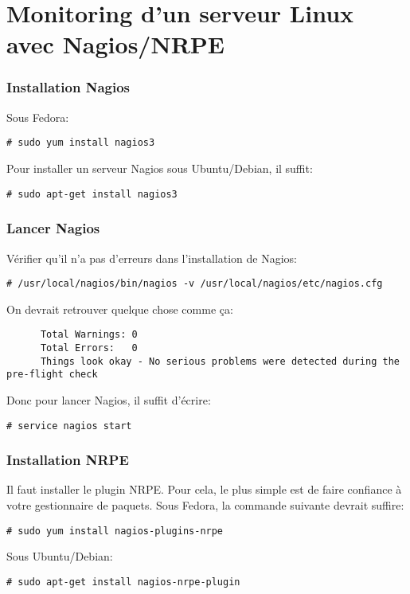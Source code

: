 \vfill \pagebreak
\part{Monitoring d'un serveur Linux avec Nagios/NRPE}

\section {Installation Nagios}
Sous Fedora:

\begin{verbatim}
# sudo yum install nagios3
\end{verbatim}

Pour installer un serveur Nagios sous Ubuntu/Debian, il suffit:
\begin{verbatim}
# sudo apt-get install nagios3
\end{verbatim}

\section {Lancer Nagios}
Vérifier qu'il n'a pas d'erreurs dans l'installation de Nagios:
\begin{verbatim}
# /usr/local/nagios/bin/nagios -v /usr/local/nagios/etc/nagios.cfg
\end{verbatim}

On devrait retrouver quelque chose comme ça:
\begin{verbatim}
      Total Warnings: 0
      Total Errors:   0
      Things look okay - No serious problems were detected during the pre-flight check
\end{verbatim}
      
Donc pour lancer Nagios, il suffit d'écrire:
\begin{verbatim}
# service nagios start
\end{verbatim}

\section {Installation NRPE}
Il faut installer le plugin NRPE. Pour cela, le plus simple est de faire confiance à votre gestionnaire de paquets.
Sous Fedora, la commande suivante devrait suffire:
\begin{verbatim}
# sudo yum install nagios-plugins-nrpe
\end{verbatim}

Sous Ubuntu/Debian:
\begin{verbatim}
# sudo apt-get install nagios-nrpe-plugin
\end{verbatim}

